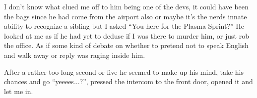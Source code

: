 I don’t know what clued me off to him being one of the devs, it could have been the bags since he had come from the airport also or maybe it's the nerds innate ability to recognize a sibling but I asked “You here for the Plasma Sprint?” 
He looked at me as if he had yet to deduse if I was there to murder him, or just rob the office. As if some kind of debate on whether to pretend not to speak English and walk away or reply was raging inside him. 

After a rather too long second or five he seemed to make up his mind, take his chances and go “yeeees...?”, pressed the intercom to the front door, opened it and let me in.